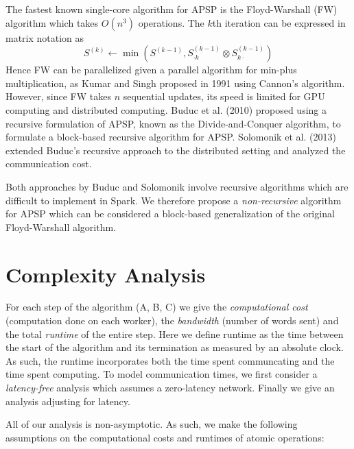 \documentclass{article} %
\begin{document}
The fastest known single-core algorithm for APSP is the Floyd-Warshall (FW)
algorithm which takes $O(n^3)$ operations.  The $k$th iteration can be
expressed in matrix notation as
\[
S^{(k)} \leftarrow \min(S^{(k-1)}, S^{(k-1)}_{\cdot k} \otimes S^{(k-1)}_{k \cdot})
\]
Hence FW can be parallelized given a parallel algorithm for min-plus
multiplication, as Kumar and Singh proposed in 1991 using Cannon's
algorithm.  However, since FW takes $n$ sequential updates, its speed
is limited for GPU computing and distributed computing.  Buduc et
al. (2010) proposed using a recursive formulation of APSP, known as
the Divide-and-Conquer algorithm, to formulate a block-based recursive
algorithm for APSP.  Solomonik et al. (2013) extended Buduc's
recursive approach to the distributed setting and analyzed the
communication cost.

Both approaches by Buduc and Solomonik involve recursive algorithms
which are difficult to implement in Spark.  We therefore propose a
\emph{non-recursive} algorithm for APSP which can be considered a
block-based generalization of the original Floyd-Warshall algorithm.

\section{Complexity Analysis}

For each step of the algorithm (A, B, C) we give the \emph{computational cost} (computation done
on each worker), the \emph{bandwidth} (number of words sent) and the
total \emph{runtime} of the entire step.  Here we define runtime as
the time between the start of the algorithm and its termination as
measured by an absolute clock. As such, the runtime incorporates both
the time spent communcating and the time spent computing.  To model
communication times, we first consider a \emph{latency-free} analysis
which assumes a zero-latency network.  Finally we give an analysis
adjusting for latency.

All of our analysis is non-asymptotic.  As such, we make the following
assumptions on the computational costs and runtimes of atomic
operations:
\end{document}
